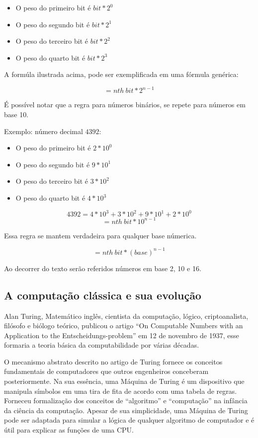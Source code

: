 \begin{itemize}
  \item O peso do primeiro bit é $bit * 2^0$
  \item O peso do segundo bit é $bit * 2^1$
  \item O peso do terceiro bit é $bit * 2^2$
  \item O peso do quarto bit é $bit * 2^3$
\end{itemize}

A formúla ilustrada acima, pode ser exemplificada em uma fórmula genérica: 

\[= nth\: bit * 2^{n-1}\]

É possível notar que a regra para números binários, se repete para números em base 10.

Exemplo: número decimal $4392$:
\begin{itemize}
  \item O peso do primeiro bit é $2 * 10^0$
  \item O peso do segundo bit é $9 * 10^1$
  \item O peso do terceiro bit é $3 * 10^2$
  \item O peso do quarto bit é $4 * 10^3$
\end{itemize}
\[ 4392 = 4*10^3 + 3*10^2 + 9*10^1 + 2*10^0\]
\[= nth\: bit * 10^{n-1}\]

Essa regra se mantem verdadeira para qualquer base númerica.

\[= nth\: bit * (base)^{n-1}\]

Ao decorrer do texto serão referidos números em base 2, 10 e 16. 

\subsection{A computação clássica e sua evolução}
Alan Turing, Matemático inglês, cientista da computação, lógico, criptoanalista, filósofo e biólogo teórico, publicou o artigo “On Computable Numbers with an Application to the Entscheidungs-problem” \cite{8} em 12 de novembro de 1937, esse formaria a teoria básica da computabilidade por várias décadas.

O mecanismo abstrato descrito no artigo de Turing fornece os conceitos fundamentais de computadores que outros engenheiros conceberam posteriormente. Na sua essência, uma Máquina de Turing é um dispositivo que manipula símbolos em uma tira de fita de acordo com uma tabela de regras. Forneceu formalização dos conceitos de “algoritmo” e “computação” na infância da ciência da computação. Apesar de sua simplicidade, uma Máquina de Turing pode ser adaptada para simular a lógica de qualquer algoritmo de computador e é útil para explicar as funções de uma CPU.

